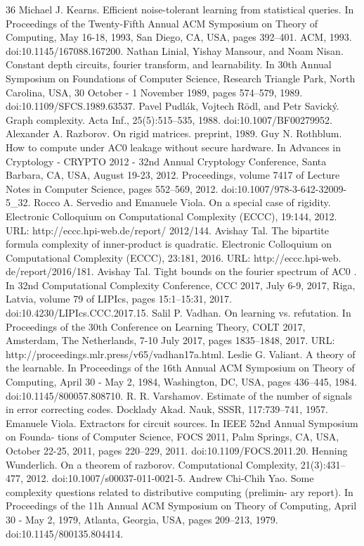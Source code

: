 \begin{thebibliography}{36}
Michael J. Kearns. Efficient noise-tolerant learning from statistical queries. In Proceedings of the Twenty-Fifth Annual ACM Symposium on Theory of Computing, May 16-18, 1993, San Diego, CA, USA, pages 392–401. ACM, 1993. doi:10.1145/167088.167200.
Nathan Linial, Yishay Mansour, and Noam Nisan. Constant depth circuits, fourier transform, and learnability. In 30th Annual Symposium on Foundations of Computer Science, Research Triangle Park, North Carolina, USA, 30 October - 1 November 1989, pages 574–579, 1989. doi:10.1109/SFCS.1989.63537.
Pavel Pudlák, Vojtech Rödl, and Petr Savický. Graph complexity. Acta Inf., 25(5):515–535, 1988. doi:10.1007/BF00279952.
Alexander A. Razborov. On rigid matrices. preprint, 1989.
Guy N. Rothblum. How to compute under AC0 leakage without secure hardware. In Advances in Cryptology - CRYPTO 2012 - 32nd Annual Cryptology Conference, Santa Barbara, CA, USA, August 19-23, 2012. Proceedings, volume 7417 of Lecture Notes in Computer Science, pages 552–569, 2012. doi:10.1007/978-3-642-32009-5\_32.
Rocco A. Servedio and Emanuele Viola. On a special case of rigidity. Electronic Colloquium on Computational Complexity (ECCC), 19:144, 2012. URL: http://eccc.hpi-web.de/report/ 2012/144.
Avishay Tal. The bipartite formula complexity of inner-product is quadratic. Electronic Colloquium on Computational Complexity (ECCC), 23:181, 2016. URL: http://eccc.hpi-web. de/report/2016/181.
Avishay Tal. Tight bounds on the fourier spectrum of AC0 . In 32nd Computational Complexity Conference, CCC 2017, July 6-9, 2017, Riga, Latvia, volume 79 of LIPIcs, pages 15:1–15:31, 2017. doi:10.4230/LIPIcs.CCC.2017.15.
Salil P. Vadhan. On learning vs. refutation. In Proceedings of the 30th Conference on Learning Theory, COLT 2017, Amsterdam, The Netherlands, 7-10 July 2017, pages 1835–1848, 2017. URL: http://proceedings.mlr.press/v65/vadhan17a.html.
Leslie G. Valiant. A theory of the learnable. In Proceedings of the 16th Annual ACM Symposium on Theory of Computing, April 30 - May 2, 1984, Washington, DC, USA, pages 436–445, 1984. doi:10.1145/800057.808710.
R. R. Varshamov. Estimate of the number of signals in error correcting codes. Docklady Akad. Nauk, SSSR, 117:739–741, 1957.
Emanuele Viola. Extractors for circuit sources. In IEEE 52nd Annual Symposium on Founda- tions of Computer Science, FOCS 2011, Palm Springs, CA, USA, October 22-25, 2011, pages 220–229, 2011. doi:10.1109/FOCS.2011.20.
Henning Wunderlich. On a theorem of razborov. Computational Complexity, 21(3):431–477, 2012. doi:10.1007/s00037-011-0021-5.
Andrew Chi-Chih Yao. Some complexity questions related to distributive computing (prelimin- ary report). In Proceedings of the 11h Annual ACM Symposium on Theory of Computing, April 30 - May 2, 1979, Atlanta, Georgia, USA, pages 209–213, 1979. doi:10.1145/800135.804414.
\end{thebibliography}
